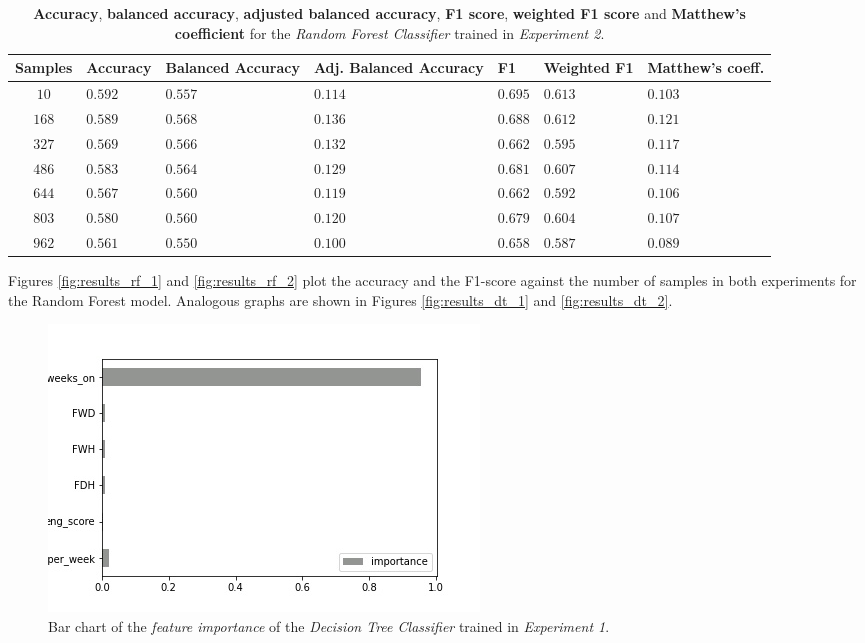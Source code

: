 \documentclass[sigplan,screen]{acmart}
\begin{document}
\begin{table}[h]
  \caption{\textbf{Accuracy}, \textbf{balanced accuracy}, \textbf{adjusted balanced accuracy}, \textbf{F1 score}, \textbf{weighted F1 score} and \textbf{Matthew's coefficient} for the \emph{Random Forest Classifier} trained in \emph{Experiment 2}.}
  \label{tab:rf_2_table_results}
  \begin{tabular}{cllllll}
    \toprule
    \textbf{Samples}&\textbf{Accuracy}&\textbf{Balanced Accuracy}&\textbf{Adj. Balanced Accuracy}&\textbf{F1}&\textbf{Weighted F1}&\textbf{Matthew's coeff.}\\
    \midrule
    $10$ & $0.592$ & $0.557$ & $0.114$ & $0.695$ & $0.613$ & $0.103$\\
    $168$ & $0.589$ & $0.568$ & $0.136$ & $0.688$ & $0.612$ & $0.121$\\
    $327$ & $0.569$ & $0.566$ & $0.132$ & $0.662$ & $0.595$ & $0.117$\\
    $486$ & $0.583$ & $0.564$ & $0.129$ & $0.681$ & $0.607$ & $0.114$\\
    $644$ & $0.567$ & $0.560$ & $0.119$ & $0.662$ & $0.592$ & $0.106$\\
    $803$ & $0.580$ & $0.560$ & $0.120$ & $0.679$ & $0.604$ & $0.107$\\
    $962$ & $0.561$ & $0.550$ & $0.100$ & $0.658$ & $0.587$ & $0.089$\\
    \bottomrule
    \end{tabular}
\end{table}

Figures \ref{fig:results_rf_1} and \ref{fig:results_rf_2} plot the accuracy and the F1-score against the number of samples in both experiments for the Random Forest model. Analogous graphs are shown in Figures \ref{fig:results_dt_1} and \ref{fig:results_dt_2}.

 \begin{figure}[h]
     \centering
     \includegraphics[width=0.5\linewidth]{reports/figures/feature_importance_dc_1.jpg}
     \caption{Bar chart of the \emph{feature importance} of the \emph{Decision Tree Classifier} trained in \emph{Experiment 1}.}
     \label{fig:fi_dc_1}
 \end{figure}
\end{document}
